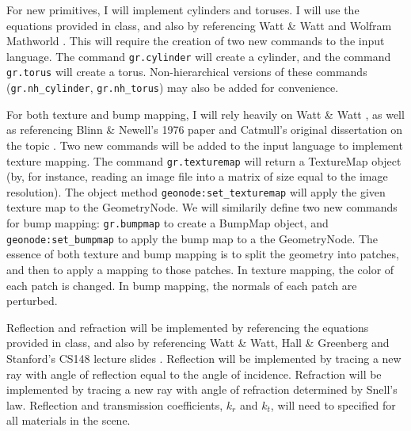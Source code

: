 \documentclass {article}
\begin{document}
\begin{description}
    
    For new primitives, I will implement cylinders and toruses. I will use the equations provided in class, and also by referencing Watt \& Watt \cite{WattQuad} and Wolfram Mathworld \cite{Weisstein}. This will require the creation of two new commands to the input language. The command  \texttt{gr.cylinder} will create a cylinder, and the command \texttt{gr.torus} will create a torus.
    Non-hierarchical versions of these commands (\texttt{gr.nh\_cylinder}, \texttt{gr.nh\_torus}) may also be added for convenience.

    For both texture and bump mapping, I will rely heavily on Watt \& Watt \cite{WattMapping}, as well as referencing Blinn \& Newell's 1976 paper \cite{Blinn} and Catmull's original dissertation on the topic \cite{Catmull}. Two new commands will be added to the input language to implement texture mapping. The command \texttt{gr.texturemap} will return a TextureMap object (by, for instance, reading an image file into a matrix of size equal to the image resolution). The object method \texttt{geonode:set\_texturemap} will apply the given texture map to the GeometryNode. We will similarily define two new commands for bump mapping: \texttt{gr.bumpmap} to create a BumpMap object, and \texttt{geonode:set\_bumpmap} to apply the bump map to a the GeometryNode. The essence of both texture and bump mapping is to split the geometry into patches, and then to apply a mapping to those patches. In texture mapping, the color of each patch is changed. In bump mapping, the normals of each patch are perturbed. 
    
    Reflection and refraction will be implemented by referencing the equations provided in class, and also by referencing Watt \& Watt, Hall \& Greenberg and Stanford's CS148 lecture slides \cite{WattLight}\cite{Hall}\cite{Fedkiw}. Reflection will be implemented by tracing a new ray with angle of reflection equal to the angle of incidence. Refraction will be implemented by tracing a new ray with angle of refraction determined by Snell's law. 
    Reflection and transmission coefficients, $k_r$ and $k_t$, will need to specified for all materials in the scene.
    

\end{description}
\end{document}
